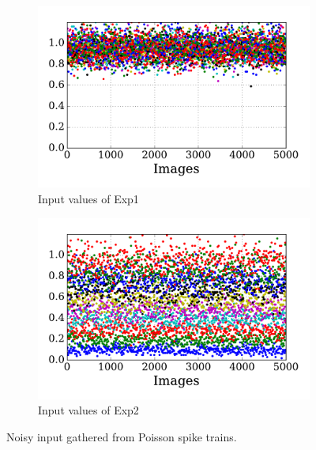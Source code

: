 \begin{figure}
	\centering
	\begin{subfigure}[t]{0.45\textwidth}
		\includegraphics[width=\textwidth]{pics_sdlm/21_exp_AE_noise/exp1.pdf}
		\caption{Input values of Exp1}
	\end{subfigure}
	\begin{subfigure}[t]{0.45\textwidth}
		\includegraphics[width=\textwidth]{pics_sdlm/21_exp_AE_noise/exp2.pdf}
		\caption{Input values of Exp2}
	\end{subfigure}
	\caption{Noisy input gathered from Poisson spike trains.}
	\label{fig:noise_input}
\end{figure}



